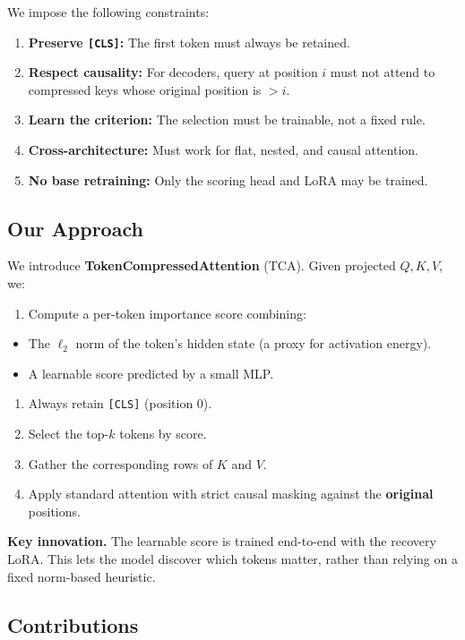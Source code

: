 We impose the following constraints:

\begin{enumerate}
\item \textbf{Preserve \texttt{[CLS]}:} The first token must always be retained.
\item \textbf{Respect causality:} For decoders, query at position $i$ must not attend
  to compressed keys whose original position is $> i$.
\item \textbf{Learn the criterion:} The selection must be trainable, not a fixed rule.
\item \textbf{Cross-architecture:} Must work for flat, nested, and causal attention.
\item \textbf{No base retraining:} Only the scoring head and LoRA may be trained.

\end{enumerate}
\subsection{Our Approach}

We introduce \textbf{TokenCompressedAttention} (TCA). Given projected $Q, K, V$, we:

\begin{enumerate}
\item Compute a per-token importance score combining:
\end{enumerate}
\begin{itemize}
\item The $\ell_2$ norm of the token's hidden state (a proxy for activation energy).
\item A learnable score predicted by a small MLP.
\end{itemize}
\begin{enumerate}
\item Always retain \texttt{[CLS]} (position 0).
\item Select the top-$k$ tokens by score.
\item Gather the corresponding rows of $K$ and $V$.
\item Apply standard attention with strict causal masking against the \textbf{original} positions.

\end{enumerate}
\textbf{Key innovation.} The learnable score is trained end-to-end with the recovery 
LoRA. This lets the model discover which tokens matter, rather than relying 
on a fixed norm-based heuristic.

\subsection{Contributions}

